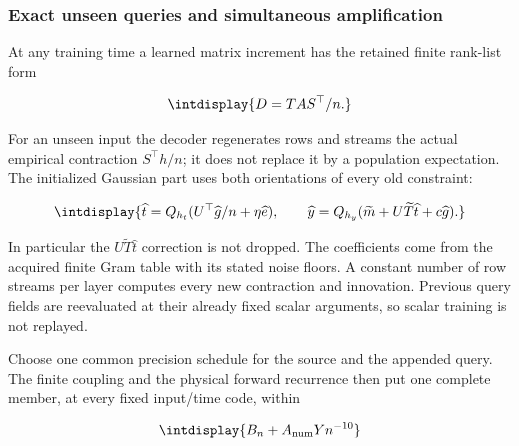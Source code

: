 \subsubsection{Exact unseen queries and simultaneous amplification}



At any training time a learned matrix increment has the retained finite rank-list form


\begingroup\renewcommand{\theHequation}{intdisplay.771}
\begin{equation*}
\intdisplay{
D=TAS^\top/n.
}
\end{equation*}
\endgroup


For an unseen input the decoder regenerates rows and streams the actual empirical contraction \(S^\top h/n\); it does not replace it by a population expectation. The initialized Gaussian part uses both orientations of every old constraint:


\begingroup\renewcommand{\theHequation}{intdisplay.772}
\begin{equation}
\intdisplay{
\widehat t=Q_{h_t}(U^\top\widehat g/n+\eta\widehat e),
\qquad
\widehat y=Q_{h_y}
(\widetilde m+U\widetilde T\widehat t+c\widehat g).
}
\label{int:eq-0370-seeded-conditional-query}
\end{equation}
\endgroup


In particular the \(U\widetilde T\widehat t\) correction is not dropped. The coefficients come from the acquired finite Gram table with its stated noise floors. A constant number of row streams per layer computes every new contraction and innovation. Previous query fields are reevaluated at their already fixed scalar arguments, so scalar training is not replayed.



Choose one common precision schedule for the source and the appended query. The finite coupling and the physical forward recurrence then put one complete member, at every fixed input/time code, within


\begingroup\renewcommand{\theHequation}{intdisplay.773}
\begin{equation*}
\intdisplay{
B_n+A_{\rm num}Yn^{-10}
}
\end{equation*}
\endgroup

